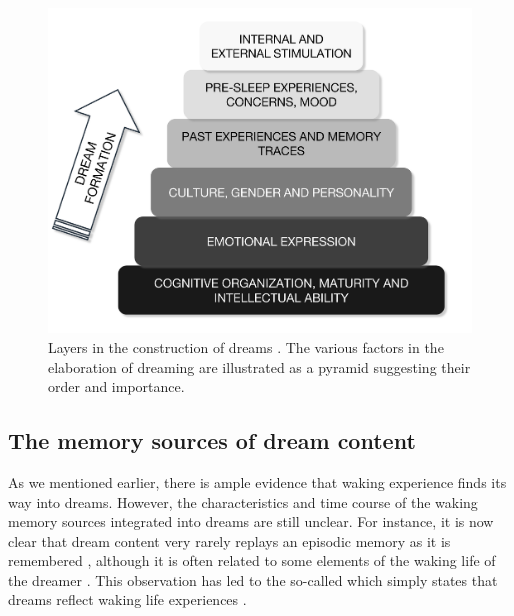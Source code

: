 \begin{figure}[htb]
	\includegraphics[width=\textwidth]{Fig/Intro/Intro_Pyramid_dream_construction/Intro_pyramid_dream.png}
	\caption[Layers in the construction of dreams]{Layers in the construction of dreams \citep{de_koninck_sleep_2012}. The various factors in the elaboration of dreaming are illustrated as a pyramid suggesting their order and importance.}
	\label{fig:intro:koninck}
\end{figure}

\subsection{The memory sources of dream content}
\label{sec:dream-content:sources:memory}

As we mentioned earlier, there is ample evidence that waking experience finds its way into dreams. However, the characteristics and time course of the waking memory sources integrated into dreams are still unclear. For instance, it is now clear that dream content very rarely replays an episodic memory as it is remembered \citep{fosse_dreaming_2003, nielsen_what_2005}, although it is often related to some elements of the waking life of the dreamer \citep{schredl_characteristics_2010, blagrove_trait_2010, ruby_experimental_2011}. This observation has led to the so-called  which simply states that dreams reflect waking life experiences \citep{schredl_continuity_2003}.

